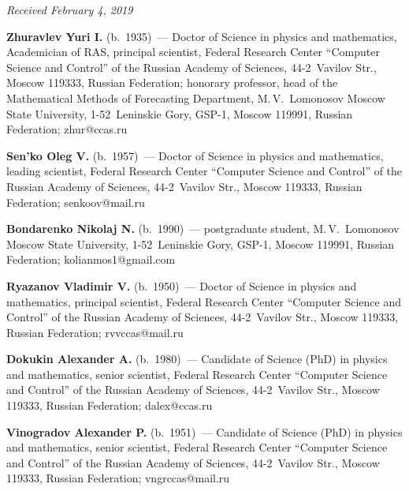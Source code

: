 
\hfill{\small\textit{Received February 4, 2019}}



\Contr


\noindent
\textbf{Zhuravlev Yuri  I.} (b.\ 1935)~--- Doctor of Science in physics and 
mathematics, Academician of RAS, principal scientist, Federal Research Center 
``Computer Science and Control'' of the Russian Academy of Sciences,  
44-2~Vavilov Str., Moscow 119333, Russian Federation; honorary professor, head 
of the Mathematical Methods of Forecasting Department, M.\,V.~Lomonosov 
Moscow State University, 1-52~Leninskie Gory, GSP-1, Moscow 119991, 
Russian Federation; \mbox{zhur@ccas.ru}

\vspace*{3pt}

\noindent
\textbf{Sen'ko Oleg V.} (b.\ 1957)~--- Doctor of Science in physics and 
mathematics, leading scientist, Federal Research Center 
``Computer Science and Control'' of the Russian Academy of Sciences,  
44-2~Vavilov Str., Moscow 119333, Russian Federation; 
\mbox{senkoov@mail.ru}

\vspace*{3pt}

\noindent
\textbf{Bondarenko Nikolaj N.} (b.\ 1990)~--- postgraduate student, 
M.\,V.~Lomonosov Moscow State University, \mbox{1-52}~Leninskie Gory, GSP-1, 
Moscow 119991, Russian Federation; \mbox{kolianmos1@gmail.com} 

\vspace*{3pt}

\noindent
\textbf{Ryazanov Vladimir V.} (b.\ 1950)~--- Doctor of Science in physics and 
mathematics, principal scientist, Federal Research Center 
``Computer Science and Control'' of the Russian Academy of Sciences,  
44-2~Vavilov Str., Moscow 119333, Russian Federation; 
\mbox{rvvccas@mail.ru}

\vspace*{3pt}

\noindent
\textbf{Dokukin Alexander A.} (b.\ 1980)~--- Candidate of Science (PhD) in 
physics and mathematics, senior scientist, Federal Research Center ``Computer 
Science and Control'' of the Russian Academy of Sciences, 44-2~Vavilov Str., 
Moscow 119333, Russian Federation; \mbox{dalex@ccas.ru}


\vspace*{3pt}

\noindent
\textbf{Vinogradov Alexander P.}  (b.\ 1951)~--- Candidate of Science (PhD) in 
physics and mathematics, senior scientist, Federal Research Center ``Computer 
Science and Control'' of the Russian Academy of Sciences, 44-2~Vavilov Str., 
Moscow 119333, Russian Federation; \mbox{vngrccas@mail.ru}


\label{end\stat}

\renewcommand{\bibname}{\protect\rm Литература}  

      